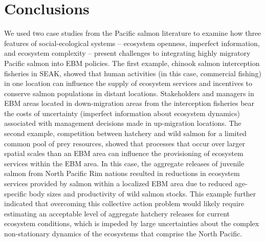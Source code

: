 \section{Conclusions}

We used two case studies from the Pacific salmon literature to examine how three
features of social-ecological systems -- ecosystem openness, imperfect
information, and ecosystem complexity -- present challenges to integrating
highly migratory Pacific salmon into EBM policies. The first example, chinook
salmon interception fisheries in SEAK, showed that human activities (in this
case, commercial fishing) in one location can influence the supply of ecosystem
services and incentives to conserve salmon populations in distant locations.
Stakeholders and managers in EBM areas located in down-migration areas from the
interception fisheries bear the costs of uncertainty (imperfect information
about ecosystem dynamics) associated with management decisions made in
up-migration locations. The second example, competition between hatchery and
wild salmon for a limited common pool of prey resources, showed that processes
that occur over larger spatial scales than an EBM area can influence the
provisioning of ecosystem services within the EBM area. In this case, the
aggregate releases of juvenile salmon from North Pacific Rim nations resulted in
reductions in ecosystem services provided by salmon within a localized EBM area
due to reduced age-specific body sizes and productivity of wild salmon stocks.
This example further indicated that overcoming this collective action problem
would likely require estimating an acceptable level of aggregate hatchery
releases for current ecosystem conditions, which is impeded by large
uncertainties about the complex non-stationary dynamics of the ecosystems that
comprise the North Pacific.


